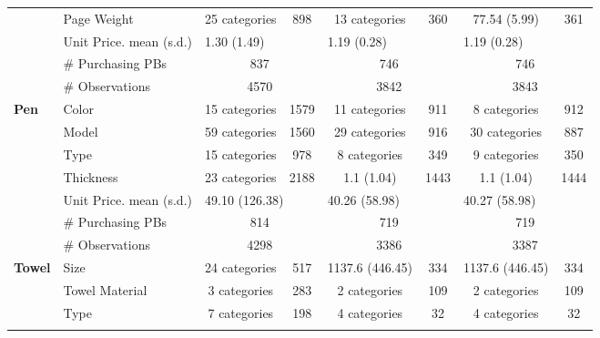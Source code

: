 \begin{longtable}{llccccccccc}
 & Page Weight & \multicolumn{2}{c}{25 categories} & 898 & \multicolumn{2}{c}{13 categories} & 360 & \multicolumn{2}{c}{77.54 (5.99)} & 361 \\* 
 \nopagebreak \cmidrule{2-11} \nopagebreak
 \nopagebreak & Unit Price. mean (s.d.) & \multicolumn{3}{l}{1.30 (1.49)} & \multicolumn{3}{l}{1.19 (0.28)} & \multicolumn{3}{l}{1.19 (0.28)} \\* 
 \nopagebreak & \# Purchasing PBs & \multicolumn{3}{c}{837} & \multicolumn{3}{c}{746} & \multicolumn{3}{c}{746} \\* 
 \nopagebreak & \# Observations & \multicolumn{3}{c}{4570} & \multicolumn{3}{c}{3842} & \multicolumn{3}{c}{3843} \\* 
 \midrule 
 \multirow{7}{*}{\textbf{Pen}} & Color & \multicolumn{2}{c}{15 categories} & 1579 & \multicolumn{2}{c}{11 categories} & 911 & \multicolumn{2}{c}{8 categories} & 912 \\* 
 & Model & \multicolumn{2}{c}{59 categories} & 1560 & \multicolumn{2}{c}{29 categories} & 916 & \multicolumn{2}{c}{30 categories} & 887 \\* 
 & Type & \multicolumn{2}{c}{15 categories} & 978 & \multicolumn{2}{c}{8 categories} & 349 & \multicolumn{2}{c}{9 categories} & 350 \\* 
 & Thickness & \multicolumn{2}{c}{23 categories} & 2188 & \multicolumn{2}{c}{1.1 (1.04)} & 1443 & \multicolumn{2}{c}{1.1 (1.04)} & 1444 \\* 
 \nopagebreak \cmidrule{2-11} 
 & Unit Price. mean (s.d.) & \multicolumn{3}{l}{49.10 (126.38)} & \multicolumn{3}{l}{40.26 (58.98)} & \multicolumn{3}{l}{40.27 (58.98)} \\* 
 & \# Purchasing PBs & \multicolumn{3}{c}{814} & \multicolumn{3}{c}{719} & \multicolumn{3}{c}{719} \\* 
 \nopagebreak & \# Observations & \multicolumn{3}{c}{4298} & \multicolumn{3}{c}{3386} & \multicolumn{3}{c}{3387} \\* 
 \midrule 
 \multirow{6}{*}{\textbf{Towel}} & Size & \multicolumn{2}{c}{24 categories} & 517 & \multicolumn{2}{c}{1137.6 (446.45)} & 334 & \multicolumn{2}{c}{1137.6 (446.45)} & 334 \\* 
 & Towel Material & \multicolumn{2}{c}{3 categories} & 283 & \multicolumn{2}{c}{2 categories} & 109 & \multicolumn{2}{c}{2 categories} & 109 \\* 
 & Type & \multicolumn{2}{c}{7 categories} & 198 & \multicolumn{2}{c}{4 categories} & 32 & \multicolumn{2}{c}{4 categories} & 32 \\* 
 \nopagebreak \cmidrule{2-11} 

\end{longtable}
